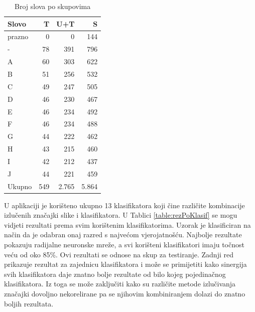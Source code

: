 \documentclass[a4paper,twocolumn,dvipdfm]{article}
\begin{document}
\begin{table}[htb]
\centering
\begin{tabular}{lrrr} \toprule
Slovo & T & U+T & S \\ \midrule
prazno & 0 & 0 & 144 \\
- & 78 & 391 & 796 \\
A & 60 & 303 & 622 \\
B & 51 & 256 & 532 \\
C & 49 & 247 & 505 \\
D & 46 & 230 & 467 \\
E & 46 & 234 & 492 \\
F & 46 & 234 & 488 \\
G & 44 & 222 & 462 \\
H & 43 & 215 & 460 \\
I & 42 & 212 & 437 \\
J & 44 & 221 & 459 \\ \midrule
Ukupno & 549 & 2.765 & 5.864 \\ \bottomrule
\end{tabular}
\caption{Broj slova po skupovima}
\label{table:brojSlova}
\end{table}

U aplikaciji je korišteno ukupno 13 klasifikatora koji čine različite
kombinacije izlučenih značajki slike i klasifikatora. U Tablici
\ref{table:rezPoKlasif} se mogu vidjeti rezultati prema svim korištenim
klasifikatorima. Uzorak je klasificiran na način da je odabran onaj razred s
najvećom vjerojatnošću. Najbolje rezultate pokazuju radijalne neuronske mreže, a
svi korišteni klasifikatori imaju točnost veću od oko 85\%. Ovi rezultati se
odnose na skup za testiranje. Zadnji red prikazuje rezultat za zajednicu
klasifikatora i može se primijetiti kako sinergija svih klasifikatora daje
znatno bolje rezultate od bilo kojeg pojedinačnog klasifikatora. Iz toga se može
zaključiti kako su različite metode izlučivanja značajki dovoljno nekorelirane
pa se njihovim kombiniranjem dolazi do znatno boljih rezultata.
\end{document}
